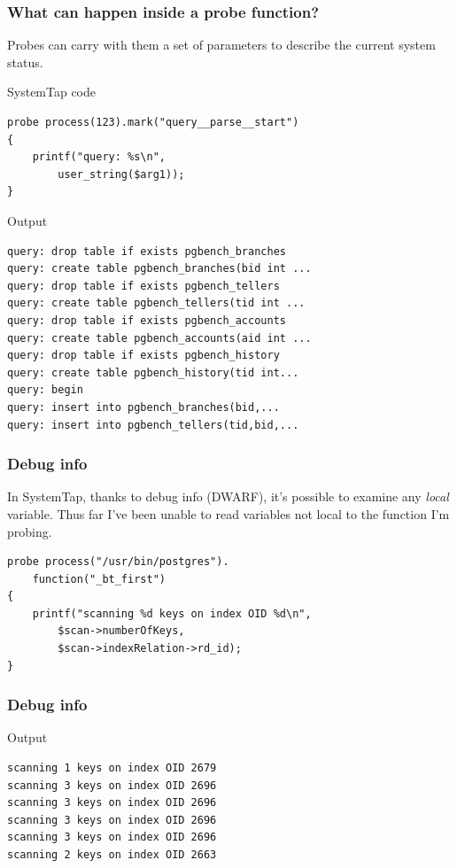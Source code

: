 \documentclass{beamer}
\begin{document}
\begin{frame}[fragile]
     \frametitle{What can happen inside a probe function?}
     Probes can carry with them a set of parameters to describe the current
     system status.
     \begin{exampleblock}{SystemTap code}
         \begin{lstlisting}
probe process(123).mark("query__parse__start")
{
    printf("query: %s\n",
        user_string($arg1));
}
         \end{lstlisting}
     \end{exampleblock}
\end{frame}

\begin{frame}[fragile]
     \begin{exampleblock}{Output}
     \begin{verbatim}
query: drop table if exists pgbench_branches
query: create table pgbench_branches(bid int ...
query: drop table if exists pgbench_tellers
query: create table pgbench_tellers(tid int ...
query: drop table if exists pgbench_accounts
query: create table pgbench_accounts(aid int ...
query: drop table if exists pgbench_history
query: create table pgbench_history(tid int...
query: begin
query: insert into pgbench_branches(bid,...
query: insert into pgbench_tellers(tid,bid,...
     \end{verbatim}
     \end{exampleblock}
\end{frame}

\begin{frame}[fragile]
    \frametitle{Debug info}
     In SystemTap, thanks to debug info (DWARF), it's possible to examine any \emph{local} variable. Thus far I've been unable to read variables not local to the function I'm probing.
     \begin{example}
         \begin{lstlisting}
probe process("/usr/bin/postgres").
    function("_bt_first")
{
    printf("scanning %d keys on index OID %d\n",
        $scan->numberOfKeys,
        $scan->indexRelation->rd_id); 
}
         \end{lstlisting}
     \end{example}
\end{frame}

\begin{frame}[fragile]
    \frametitle{Debug info}
     \begin{exampleblock}{Output}
     \begin{verbatim}
scanning 1 keys on index OID 2679
scanning 3 keys on index OID 2696
scanning 3 keys on index OID 2696
scanning 3 keys on index OID 2696
scanning 3 keys on index OID 2696
scanning 2 keys on index OID 2663
     \end{verbatim}
     \end{exampleblock}
\end{frame}
\end{document}

